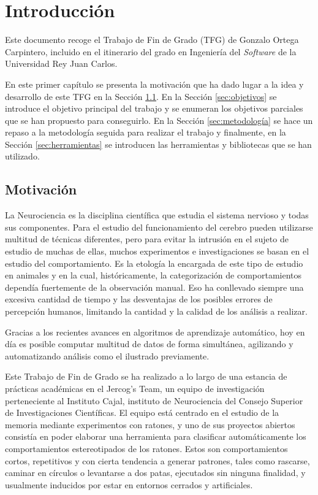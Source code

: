 \chapter{Introducción}
Este documento recoge el Trabajo de Fin de Grado (TFG) de Gonzalo Ortega Carpintero, incluido en el itinerario del grado en Ingeniería del \textit{Software} de la Universidad Rey Juan Carlos.

En este primer capítulo se presenta la motivación que ha dado lugar a la idea y desarrollo de este TFG en la Sección \ref{sec:motivacion}. En la Sección \ref{sec:objetivos} se introduce el objetivo principal del trabajo y se enumeran los objetivos parciales que se han propuesto para conseguirlo. En la Sección \ref{sec:metodología} se hace un repaso a la metodología seguida para realizar el trabajo y finalmente, en la Sección \ref{sec:herramientas} se introducen las herramientas y bibliotecas que se han utilizado.

\section{Motivación} \label{sec:motivacion}

La Neurociencia es la disciplina científica que estudia el sistema nervioso y todas sus componentes. Para el estudio del funcionamiento del cerebro pueden utilizarse multitud de técnicas diferentes, pero para evitar la intrusión en el sujeto de estudio de muchas de ellas, muchos experimentos e investigaciones se basan en el estudio del comportamiento. Es la etología la encargada de este tipo de estudio en animales y en la cual, históricamente, la categorización de comportamientos dependía fuertemente de la observación manual. Eso ha conllevado siempre una excesiva cantidad de tiempo y las desventajas de los posibles errores de percepción humanos, limitando la cantidad y la calidad de los análisis a realizar.

Gracias a los recientes avances en algoritmos de aprendizaje automático, hoy en día es posible computar multitud de datos de forma simultánea, agilizando y automatizando análisis como el ilustrado previamente.

Este Trabajo de Fin de Grado se ha realizado a lo largo de una estancia de prácticas académicas en el Jercog's Team, un equipo de investigación perteneciente al Instituto Cajal, instituto de Neurociencia del Consejo Superior de Investigaciones Científicas. El equipo está centrado en el estudio de la memoria mediante experimentos con ratones, y uno de sus proyectos abiertos consistía en poder elaborar una herramienta para clasificar automáticamente los comportamientos estereotipados de los ratones. Estos son comportamientos cortos, repetitivos y con cierta tendencia a generar patrones, tales como rascarse, caminar en círculos o levantarse a dos patas, ejecutados sin ninguna finalidad, y usualmente inducidos por estar en entornos cerrados y artificiales.

